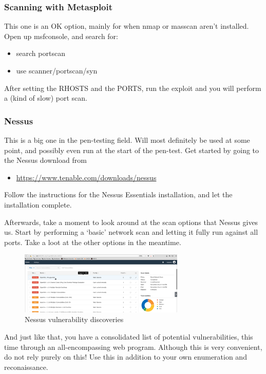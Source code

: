 \documentclass[a4paper,11pt]{article}
\renewcommand{\tt}[2][tt]{\textcolor{#1}{\ttfamily #2}}%
\begin{document}
\subsubsection{Scanning with Metasploit}

This one is an OK option, mainly for when nmap or masscan aren't installed. Open up \tt{msfconsole}, and search for:
\begin{itemize}
    \item \tt{search portscan}
    \item \tt{use scanner/portscan/syn}
\end{itemize}
After setting the \tt{RHOSTS} and the \tt{PORTS}, run the exploit and you will perform a (kind of slow) port scan.

\subsubsection{Nessus}

This is a big one in the pen-testing field. Will most definitely be used at some point, and possibly even run at the start of the pen-test. Get started by going to the Nessus download from 
\begin{itemize}
    \item \url{https://www.tenable.com/downloads/nessus}
\end{itemize}
Follow the instructions for the Nessus Essentials installation, and let the installation complete.

Afterwards, take a moment to look around at the scan options that Nessus gives us. Start by performing a `basic' network scan and letting it fully run against all ports. Take a loot at the other options in the meantime.

\begin{figure}[h]
    \centering
    \includegraphics[width=0.7\textwidth]{images/nessusk2.png}
    \caption{Nessus vulnerability discoveries}
\end{figure}

And just like that, you have a consolidated list of potential vulnerabilities, this time through an all-encompassing web program. Although this is very convenient, do not rely purely on this! Use this in addition to your own enumeration and reconaissance.
\pagebreak
\end{document}
